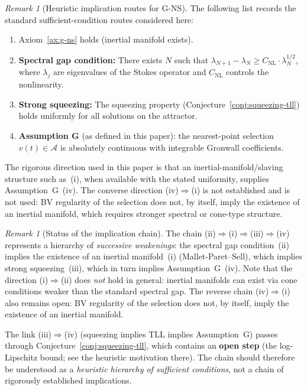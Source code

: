 \documentclass[12pt,a4paper]{article}
\theoremstyle{definition}
\theoremstyle{plain}
\theoremstyle{remark}
\newtheorem{remark}[definition]{Remark}
\begin{document}
\begin{remark}[Heuristic implication routes for G-NS]\label{prop:g-equivalences}
The following list records the standard sufficient-condition routes considered here:
\begin{enumerate}
\item[(i)] Axiom~\ref{ax:g-ns} holds (inertial manifold exists).
\item[(ii)] \textbf{Spectral gap condition:} There exists $N$ such that $\lambda_{N+1} - \lambda_N \geq C_{\mathrm{NL}} \cdot \lambda_N^{1/2}$, where $\lambda_j$ are eigenvalues of the Stokes operator and $C_{\mathrm{NL}}$ controls the nonlinearity.
\item[(iii)] \textbf{Strong squeezing:} The squeezing property (Conjecture~\ref{conj:squeezing-tll}) holds uniformly for all solutions on the attractor.
\item[(iv)] \textbf{Assumption G} (as defined in this paper): the nearest-point selection $v(t) \in \mathcal{A}$ is absolutely continuous with integrable Gronwall coefficients.
\end{enumerate}
The rigorous direction used in this paper is that an inertial-manifold/slaving structure such as~(i), when available with the stated uniformity, supplies Assumption~G~(iv). The converse direction (iv)$\Rightarrow$(i) is not established and is not used: BV regularity of the selection does not, by itself, imply the existence of an inertial manifold, which requires stronger spectral or cone-type structure.
\end{remark}

\begin{remark}[Status of the implication chain]
\label{rem:iv-implies-i-status}
The chain \textup{(ii)$\Rightarrow$(i)$\Rightarrow$(iii)$\Rightarrow$(iv)} represents a hierarchy of \emph{successive weakenings}: the spectral gap condition~(ii) implies the existence of an inertial manifold~(i) (Mallet-Paret--Sell), which implies strong squeezing~(iii), which in turn implies Assumption~G~(iv).  Note that the direction \textup{(i)$\Rightarrow$(ii)} does \emph{not} hold in general: inertial manifolds can exist via cone conditions weaker than the standard spectral gap.  The reverse chain \textup{(iv)$\Rightarrow$(i)} also remains open: BV regularity of the selection does not, by itself, imply the existence of an inertial manifold.

The link \textup{(iii)$\Rightarrow$(iv)} (squeezing implies TLL implies Assumption~G) passes through Conjecture~\ref{conj:squeezing-tll}, which contains an \textbf{open step} (the log-Lipschitz bound; see the heuristic motivation there).  The chain should therefore be understood as a \emph{heuristic hierarchy of sufficient conditions}, not a chain of rigorously established implications.
\end{remark}
\end{document}
